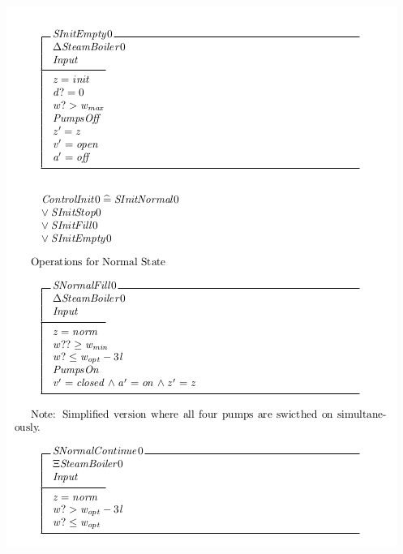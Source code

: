 \begin{center}
    \noindent \includegraphics[scale=0.8]{examples/steamboiler/0c.png}
\end{center}

